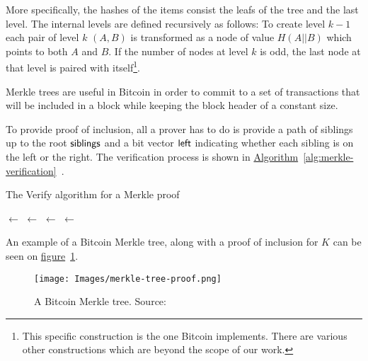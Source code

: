 More specifically, the hashes of the items consist the leafs of the tree and the last level. The internal levels are defined recursively as follows: To create level $k-1$ each pair of level $k$ $(A, B)$ is transformed as a node of value $H(A || B)$ which points to both $A$ and $B$. If the number of nodes at level $k$ is odd, the last node at that level is paired with itself\footnote{This specific construction is the one Bitcoin implements. There are various other constructions which are beyond the scope of our work.}.

Merkle trees are useful in Bitcoin in order to commit to a set of transactions that will be included in a block while keeping the block header of a constant size.

To provide proof of inclusion, all a prover has to do is provide a path of siblings up to the root $\sf{siblings}$ and a bit vector $\sf{left}$ indicating whether each sibling is on the left or the right. The verification process is shown in \hyperref[alg:merkle-verification]{Algorithm}~\ref{alg:merkle-verification}~\cite{gtklocker}.

\begin{algorithm}
  \caption{\label{alg:merkle-verification}The \textsf{Verify} algorithm
    for a Merkle proof}
    \begin{algorithmic}[1]
            \State {}$\gets$
              \State {}$\gets$
                \State {}$\gets$
              \Else
                \State {}$\gets$
              \EndIf
            \EndWhile
            \State{}
        \EndFunction
    \end{algorithmic}
\end{algorithm}

An example of a Bitcoin Merkle tree, along with a proof of inclusion for $K$ can be seen on \hyperref[fig:merkletree]{figure}~\ref{fig:merkletree}.

\begin{figure}[ht!]
  \centering
  \texttt{[image: Images/merkle-tree-proof.png]}
  \caption{A Bitcoin Merkle tree. Source:~\cite{mastering}}
  \label{fig:merkletree}
\end{figure}
%
